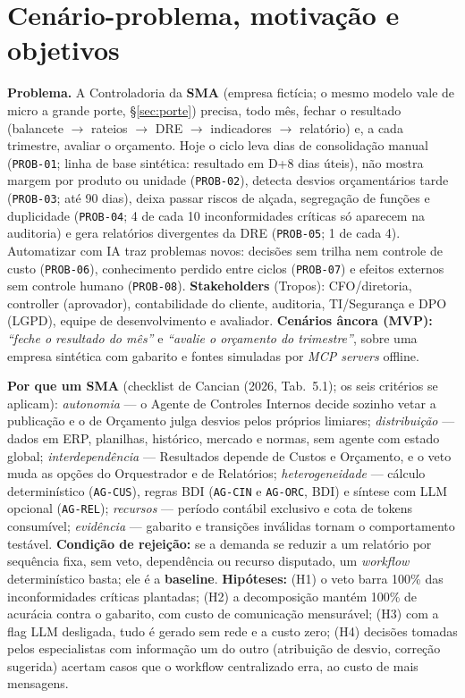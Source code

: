 \documentclass[10pt,a4paper]{article}
\newcommand{\code}[1]{\texttt{#1}}
\begin{document}
\section{Cenário-problema, motivação e objetivos}
\textbf{Problema.} A Controladoria da \textbf{SMA} (empresa fictícia; o mesmo modelo vale de micro a grande
porte, \S\ref{sec:porte}) precisa, todo mês, fechar o resultado
(balancete $\rightarrow$ rateios $\rightarrow$ DRE $\rightarrow$ indicadores $\rightarrow$ relatório) e, a cada
trimestre, avaliar o orçamento. Hoje o ciclo leva dias de consolidação manual (\code{PROB-01}; linha de base
sintética: resultado em D+8 dias úteis), não mostra margem por produto ou unidade (\code{PROB-02}), detecta desvios
orçamentários tarde (\code{PROB-03}; até 90 dias), deixa passar riscos de alçada, segregação de funções e
duplicidade (\code{PROB-04}; 4 de cada 10 inconformidades críticas só aparecem na auditoria) e gera relatórios
divergentes da DRE (\code{PROB-05}; 1 de cada 4). Automatizar com IA traz problemas novos: decisões sem trilha nem
controle de custo (\code{PROB-06}), conhecimento perdido entre ciclos (\code{PROB-07}) e efeitos externos sem
controle humano (\code{PROB-08}). \textbf{Stakeholders} (Tropos): CFO/diretoria, controller (aprovador),
contabilidade do cliente, auditoria, TI/Segurança e DPO (LGPD), equipe de desenvolvimento e avaliador.
\textbf{Cenários âncora (MVP):} \emph{“feche o resultado do mês”} e \emph{“avalie o orçamento do trimestre”}, sobre
uma empresa sintética com gabarito e fontes simuladas por \emph{MCP servers} offline.

\textbf{Por que um SMA} (checklist de Cancian (2026, Tab.~5.1); os seis critérios se aplicam):
\emph{autonomia} — o Agente de Controles Internos decide sozinho vetar a publicação e o de Orçamento julga desvios
pelos próprios limiares; \emph{distribuição} — dados em ERP, planilhas, histórico, mercado e normas, sem agente com
estado global; \emph{interdependência} — Resultados depende de Custos e Orçamento, e o veto muda as opções do
Orquestrador e de Relatórios; \emph{heterogeneidade} — cálculo determinístico (\code{AG-CUS}), regras BDI
(\code{AG-CIN} e \code{AG-ORC}, BDI) e síntese com LLM opcional (\code{AG-REL}); \emph{recursos} — período contábil exclusivo e cota de
tokens consumível; \emph{evidência} — gabarito e transições inválidas tornam o comportamento testável.
\textbf{Condição de rejeição:} se a demanda se reduzir a um relatório por sequência fixa, sem veto, dependência ou
recurso disputado, um \emph{workflow} determinístico basta; ele é a \textbf{baseline}. \textbf{Hipóteses:} (H1) o
veto barra 100\% das inconformidades críticas plantadas; (H2) a decomposição mantém 100\% de acurácia contra o
gabarito, com custo de comunicação mensurável; (H3) com a flag LLM desligada, tudo é gerado sem rede e a custo zero;
(H4) decisões tomadas pelos especialistas com informação um do outro (atribuição de desvio, correção sugerida)
acertam casos que o workflow centralizado erra, ao custo de mais mensagens.
\end{document}

